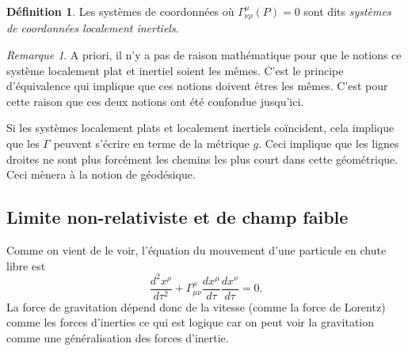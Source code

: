 \documentclass[a4paper,11pt]{report}
\theoremstyle{definition}
\theoremstyle{plain}
\theoremstyle{definition}
\newtheorem{defn}{Définition}[chapter]
\theoremstyle{remark}
\newtheorem{rmk}{Remarque}[chapter]
\begin{document}
            \begin{defn}
                Les systèmes de coordonnées où $\Gamma^\mu_{\nu\rho}(P) = 0$ sont dits \textit{systèmes de coordonnées localement inertiels}.
            \end{defn}
            
            \begin{rmk}
                A priori, il n'y a pas de raison mathématique pour que le notions ce système localement plat et inertiel soient les mêmes. C'est le principe d'équivalence qui implique que ces notions doivent êtres les mêmes. C'est pour cette raison que ces deux notions ont été confondue jusqu'ici.
            \end{rmk}
            
            Si les systèmes localement plats et localement inertiels coïncident, cela implique que les $\Gamma$ peuvent s'écrire en terme de la métrique $g$. Ceci implique que les lignes droites ne sont plus forcément les chemins les plus court dans cette géométrique. Ceci mènera à la notion de géodésique.
            
        \subsection{Limite non-relativiste et de champ faible}
            
            Comme on vient de le voir, l'équation du mouvement d'une particule en chute libre est 
            \begin{equation}
                \frac{d^2x^\rho}{d\tau^2}+\Gamma^\rho_{\mu\nu}\frac{dx^\mu}{d\tau}\frac{dx^\nu}{d\tau} = 0.
            \end{equation}
            La force de gravitation dépend donc de la vitesse (comme la force de Lorentz) comme les forces d'inerties ce qui est logique car on peut voir la gravitation comme une généralisation des forces d'inertie.\\
            
\end{document}
